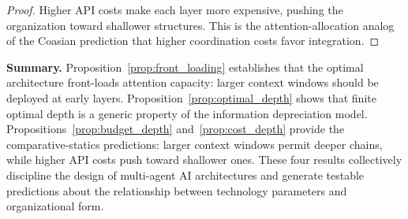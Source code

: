 \begin{proof}
Higher API costs make each layer more expensive, pushing the organization toward shallower structures. This is the attention-allocation analog of the Coasian prediction that higher coordination costs favor integration.
\end{proof}

\vspace{1em}
\noindent\textbf{Summary.} Proposition~\ref{prop:front_loading} establishes that the optimal architecture front-loads attention capacity: larger context windows should be deployed at early layers. Proposition~\ref{prop:optimal_depth} shows that finite optimal depth is a generic property of the information depreciation model. Propositions~\ref{prop:budget_depth} and~\ref{prop:cost_depth} provide the comparative-statics predictions: larger context windows permit deeper chains, while higher API costs push toward shallower ones. These four results collectively discipline the design of multi-agent AI architectures and generate testable predictions about the relationship between technology parameters and organizational form.
